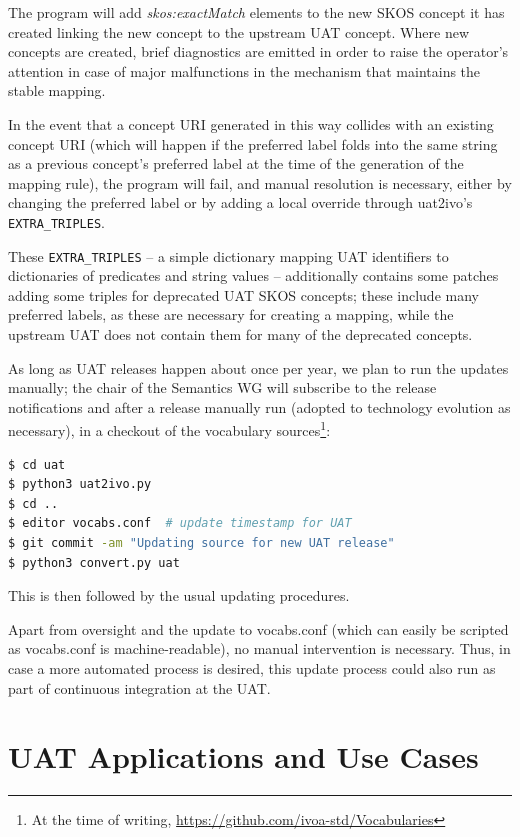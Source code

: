 \documentclass[11pt,a4paper]{ivoa}
\newcommand{\vocterm}[1]{\emph{\color{termcolor}#1}}
\begin{document}
The program will add \vocterm{skos:exactMatch} elements to the new
SKOS concept it has created linking the new concept to the upstream UAT
concept.  Where new concepts are created, brief diagnostics are emitted
in order to raise the operator's attention in case of major malfunctions
in the mechanism that maintains the stable mapping.

In the event that a concept URI generated in this way collides with an
existing concept URI (which will happen if the preferred label folds
into the same string as a previous concept's preferred label at the time
of the generation of the mapping rule), the program will fail, and
manual resolution is necessary, either by changing the preferred label
or by adding a local override through uat2ivo's \verb|EXTRA_TRIPLES|.

These \verb|EXTRA_TRIPLES| -- a simple dictionary mapping UAT
identifiers to dictionaries of predicates and string values --
additionally contains some patches adding some triples for deprecated
UAT SKOS concepts; these include many preferred labels, as these are
necessary for creating a mapping, while the upstream UAT does not contain
them for many of the deprecated concepts.

As long as UAT releases happen about once per year, we plan to run the
updates manually; the chair of the Semantics WG will subscribe to the
release notifications and after a release manually run (adopted to
technology evolution as necessary), in a checkout of the vocabulary
sources\footnote{At the time of writing, 
\url{https://github.com/ivoa-std/Vocabularies}}:

\begin{lstlisting}[language=sh]
$ cd uat
$ python3 uat2ivo.py
$ cd ..
$ editor vocabs.conf  # update timestamp for UAT
$ git commit -am "Updating source for new UAT release"
$ python3 convert.py uat
\end{lstlisting}

This is then followed by the usual updating procedures.

Apart from oversight and the update to vocabs.conf (which can easily be
scripted as vocabs.conf is machine-readable),  no manual intervention is
necessary.  Thus, in case a more automated process is desired, this
update process could also run as part of continuous integration at the
UAT.

\section{UAT Applications and Use Cases}
\end{document}

